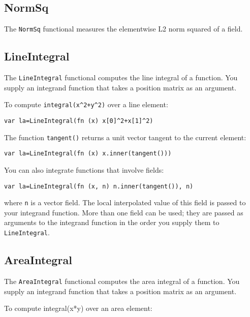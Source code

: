 \hypertarget{normsq}{%
\subsection{NormSq}\label{normsq}}

The \texttt{NormSq} functional measures the elementwise L2 norm squared
of a field.

\hypertarget{lineintegral}{%
\subsection{LineIntegral}\label{lineintegral}}

The \texttt{LineIntegral} functional computes the line integral of a
function. You supply an integrand function that takes a position matrix
as an argument.

To compute \texttt{integral(x\^{}2+y\^{}2)} over a line element:

\begin{lstlisting}
var la=LineIntegral(fn (x) x[0]^2+x[1]^2)
\end{lstlisting}

The function \texttt{tangent()} returns a unit vector tangent to the
current element:

\begin{lstlisting}
var la=LineIntegral(fn (x) x.inner(tangent()))
\end{lstlisting}

You can also integrate functions that involve fields:

\begin{lstlisting}
var la=LineIntegral(fn (x, n) n.inner(tangent()), n)
\end{lstlisting}

where \texttt{n} is a vector field. The local interpolated value of this
field is passed to your integrand function. More than one field can be
used; they are passed as arguments to the integrand function in the
order you supply them to \texttt{LineIntegral}.

\hypertarget{areaintegral}{%
\subsection{AreaIntegral}\label{areaintegral}}

The \texttt{AreaIntegral} functional computes the area integral of a
function. You supply an integrand function that takes a position matrix
as an argument.

To compute integral(x*y) over an area element:

